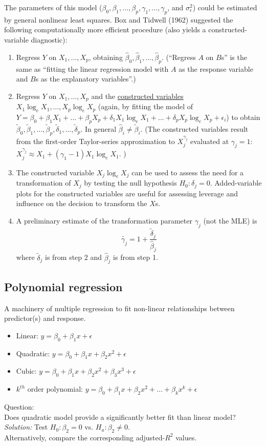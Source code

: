 The parameters of this model ($\beta_0, \beta_1, \dots, \beta_p, \gamma_1, \dots, \gamma_p$, and $\sigma_\epsilon^2$) could be estimated by general nonlinear least squares.
Box and Tidwell (1962) suggested the following computationally more efficient procedure (also yields a constructed-variable diagnostic):
\begin{enumerate}
  \item Regress $Y$ on $X_1, \dots, X_p$, obtaining $\hat{\beta}_0, \hat{\beta}_1, \dots, \hat{\beta}_p$.  (``Regress $A$ on $B$s'' is the same as ``fitting the linear regression model with $A$ as the response variable and $B$s as the explanatory variables''.)
  \item Regress $Y$ on $X_1, \dots, X_p$ and the \underline{constructed variables} $X_1 \log_e X_1, \dots, X_p \log_e X_p$ (again, by fitting the model of $Y = \beta_0 + \beta_1 X_1 + \dots + \beta_p X_p + \delta_1 X_1 \log_e X_1 + \dots + \delta_p X_p \log_e X_p + \epsilon_i$) to obtain $\tilde{\beta}_0, \tilde{\beta}_1, \dots, \tilde{\beta}_p, \tilde{\delta}_1, \dots, \tilde{\delta}_p$.
  In general $\hat{\beta}_i \ne \tilde{\beta}_i$.  (The constructed variables result from the first-order Taylor-series approximation to $X_j^{\gamma_j}$ evaluated at $\gamma_j = 1$: $ X_j^{\gamma_j} \approx X_1 + (\gamma_1 - 1) X_1 \log_e X_1 $. )
  \item The constructed variable $X_j \log_e X_j$ can be used to assess the need for a transformation of $X_j$ by testing the null hypothesis $H_0:\delta_j = 0$.
  Added-variable plots for the constructed variables are useful for assessing leverage and influence on the decision to transform the $X$s.
  \item A preliminary estimate of the transformation parameter $\gamma_j$ (not the MLE) is
  $$
  \tilde{\gamma_j} = 1 + \frac{\tilde{\delta}_j}{\hat{\beta}_j}
  $$
  where $\tilde{\delta}_j$ is from step 2 and $\hat{\beta}_j$ is from step 1.
\end{enumerate}

\subsection*{Polynomial regression}
A machinery of multiple regression to fit non-linear relationships between predictor(s) and response.
\begin{itemize}
  \item Linear: $y = \beta_0 + \beta_1 x + \epsilon$
  \item Quadratic: $y = \beta_0 + \beta_1 x + \beta_2 x^2 + \epsilon$
  \item Cubic: $y = \beta_0 + \beta_1 x  +\beta_2 x^2 + \beta_3 x^3 + \epsilon$ 
  \item $k^{th}$ order polynomial:  $y = \beta_0 + \beta_1 x + \beta_2 x^2 + \dots +\beta_k x^k + \epsilon$
\end{itemize}

Question:\\
Does quadratic model provide a significantly better fit than linear model?\\
{\it Solution: }Test $H_0: \beta_2 = 0$ vs. $H_a: \beta_2 \ne 0$.\\
Alternatively, compare the corresponding adjusted-$R^2$ values.















